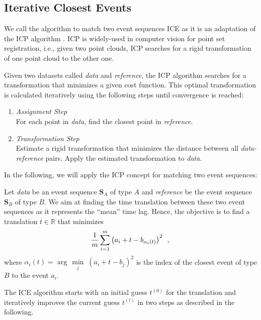 \documentclass[conference]{IEEEtran}
\theoremstyle{examplestyle}
\begin{document}
\subsection{Iterative Closest Events}
\label{sec:ice}

We call the algorithm to match two event sequences \acf{ICE} as it is an adaptation of the \acf{ICP} algorithm \cite{Besl1992}. \ac{ICP} is widely-used in computer vision for point set registration, i.e., given two point clouds, \ac{ICP} searches for a rigid transformation of one point cloud to the other one. 

Given two datasets called \textit{data} and \textit{reference}, the \ac{ICP} algorithm searches for a transformation that minimizes a given cost function. This optimal transformation is calculated iteratively using the following steps \cite{Besl1992} until convergence is reached:

\begin{enumerate}
	\item \emph{Assignment Step}\\ 
	For each point in \textit{data}, find the closest point in \textit{reference}.
	\item \emph{Transformation Step}\\ Estimate a rigid transformation that minimizes the distance between all \textit{data-reference} pairs. Apply the estimated transformation to \textit{data}.
\end{enumerate}


In the following, we will apply the \ac{ICP} concept for matching two event sequences:

Let \textit{data} be an event sequence \(\pmb{S}_A\) of type \(A\) and \textit{reference} be the event sequence \(\pmb{S}_B\) of type \(B\). 
We aim at finding the time translation between these two event sequences as it represents the ``mean'' time lag.
Hence, the objective is to find a translation $t \in \mathbb{R}$ that minimizes 
\begin{equation}
 \dfrac{1}{m} \sum_{i = 1}^{m} \left( a_i + t - b_{\alpha_i(t)} \right)^2 \enspace , \\
\end{equation}
where $\alpha_i(t)= \arg\,\min\limits_j \; (a_i+t-b_j)^2$ is the index of the closest event of type $B$ to the event $a_i$.

The \ac{ICE} algorithm starts with an initial guess $t^{(0)}$ for the translation and iteratively improves the current guess $t^{(l)}$ in two steps as described in the following.
\end{document}
